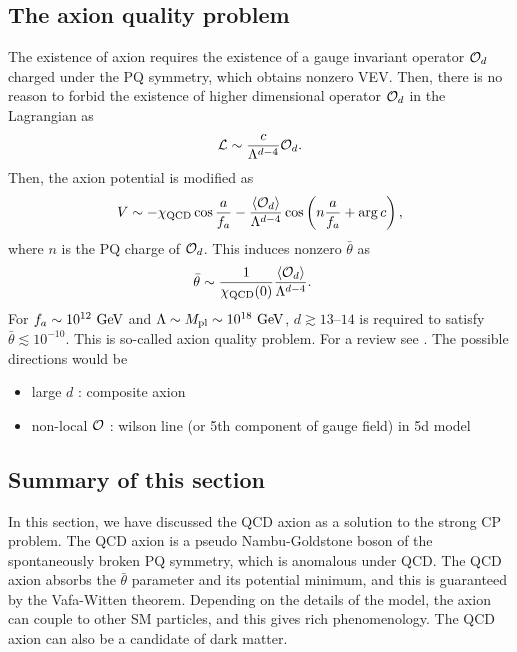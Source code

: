 \documentclass[11pt,a4paper]{article}
\begin{document}
\subsection{The axion quality problem}
The existence of axion requires the existence of a gauge invariant operator ${\cal O}_d$ charged under the PQ symmetry, which obtains nonzero VEV.
Then, there is no reason to forbid the existence of higher dimensional operator ${\cal O}_d$ in the Lagrangian as
\begin{align}
    {\cal L} \sim \frac{c}{\Lambda^{d-4}} {\cal O}_d.
\end{align}
Then, the axion potential is modified as
\begin{align}
    V \sim -\chi_{\rm QCD} \cos \frac{a}{f_a} - \frac{\langle {\cal O}_d \rangle}{\Lambda^{d-4}} \cos\left( n \frac{a}{f_a} + \arg c \right),
\end{align}
where $n$ is the PQ charge of ${\cal O}_d$.
This induces nonzero $\bar\theta$ as
\begin{align}
    \bar\theta
    &\sim \frac{1}{\chi_{\rm QCD}(0)} \frac{\langle {\cal O}_d \rangle}{\Lambda^{d-4}}.
\end{align}
For $f_a \sim 10^{12}~{\rm GeV}$ and $\Lambda \sim M_{\rm pl} \sim 10^{18}~{\rm GeV}$, $d \gtrsim 13\text{--}14$ is required to satisfy $\bar\theta \lesssim 10^{-10}$.
This is so-called axion quality problem. For a review see \cite{Reece:2023czb}.
The possible directions would be
\begin{itemize}
    \item large $d$ : composite axion
    \item non-local ${\cal O}$ : wilson line (or 5th component of gauge field) in 5d model
\end{itemize}

\subsection{Summary of this section}
In this section, we have discussed the QCD axion as a solution to the strong CP problem. The QCD axion is a pseudo Nambu-Goldstone boson of the spontaneously broken PQ symmetry, which is anomalous under QCD. The QCD axion absorbs the $\bar\theta$ parameter and its potential minimum, and this is guaranteed by the Vafa-Witten theorem. Depending on the details of the model, the axion can couple to other SM particles, and this gives rich phenomenology. The QCD axion can also be a candidate of dark matter.


\end{document}
